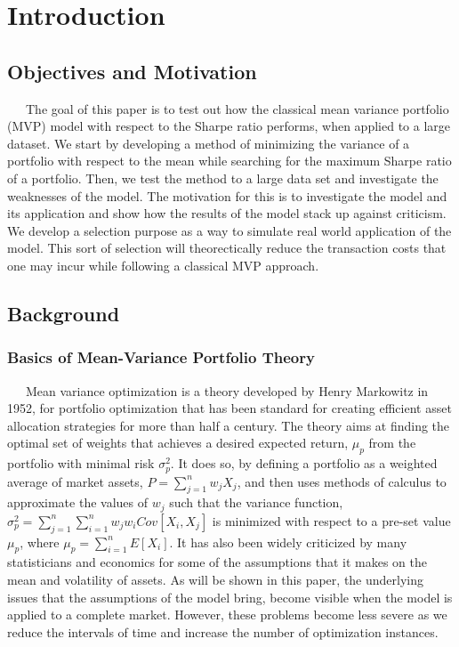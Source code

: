 \documentclass[12pt,titlepage,letter]{article}
\begin{document}
\section{Introduction}
	\subsection{Objectives and Motivation}
		\ \ \ The goal of this paper is to test out how the classical mean variance portfolio (MVP) model with respect to the Sharpe ratio performs, when applied to a large dataset. We start by developing a method of minimizing the variance of a portfolio with respect to the mean while searching for the maximum Sharpe ratio of a portfolio. Then, we test the method to a large data set and investigate the weaknesses of the model. The motivation for this is to investigate the model and its application and show how the results of the model stack up against criticism. We develop a selection purpose as a way to simulate real world application of the model. This sort of selection will theorectically reduce the transaction costs that one may incur while following a classical MVP approach. \\ 
	\subsection{Background}
		\subsubsection{Basics of Mean-Variance Portfolio Theory}
		\ \ \  Mean variance optimization is a theory developed by Henry Markowitz in 1952, for portfolio optimization that has been standard for creating efficient asset allocation strategies for more than half a century. The theory aims at finding the optimal set of weights that achieves a desired expected return, $\mu_p$ from the portfolio with minimal risk $\sigma^2_p$. It does so, by defining a portfolio as a weighted average of market assets, $P = \sum_{j=1}^n w_j X_j$, and then uses methods of calculus to approximate the values of $w_j$ such that the variance function, $\sigma_p^2 = \sum_{j=1}^n\sum_{i=1}^nw_jw_iCov[X_i,X_j]$ is minimized with respect to a pre-set value $\mu_p$, where $\mu_p=\sum_{i=1}^nE[X_i]$.  It has also been widely criticized by many statisticians and economics for some of the assumptions that it makes on the mean and volatility of assets. As will be shown in this paper, the underlying issues that the assumptions of the model bring, become visible when the model is applied to a complete market. However, these problems become less severe as we reduce the intervals of time and increase the number of optimization instances.\\
\end{document}
